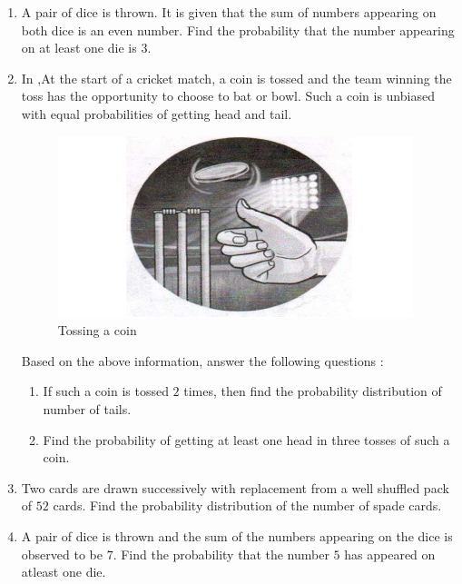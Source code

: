 \begin{enumerate}[label=\thesection.\arabic*.,ref=\thesection.\theenumi]
\item A pair of dice is thrown. It is given that the sum of numbers appearing on both dice is an even number. Find the probability that the number appearing on at least one die is $3$.

\item In ,At the start of a cricket match, a coin is tossed and the team winning the 
toss has the opportunity to choose to bat or bowl. Such a coin is unbiased 
with equal probabilities of getting head and tail.

\begin{figure}[H]
        \centering
        \includegraphics[width=\columnwidth]{./figs/Screenshot (19).png}
        \caption{Tossing a coin}
        \label{fig:fig1.png}
    \end{figure}

Based on the above information, answer the following questions :
\begin{enumerate}[label=(\alph*)]
 \item  If such a coin is tossed $2$ times, then find the probability 
distribution of number of tails.
 
 \item Find the probability of getting at least one head in three tosses of 
such a coin. 
\end{enumerate}

\item Two cards are drawn successively with replacement from a well shuffled pack of $52$ cards. Find the probability distribution of the number of spade cards.

\item A pair of dice is thrown and the sum of the numbers appearing on the dice is observed to be $7$. Find the probability that the number $5$ has appeared on atleast one die.


\end{enumerate}
